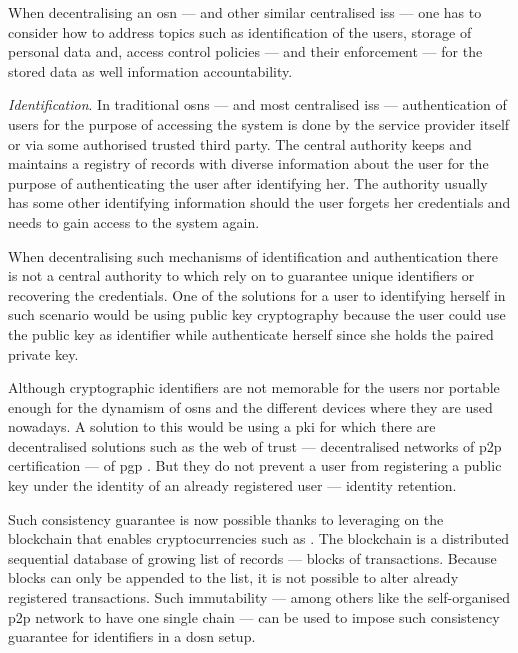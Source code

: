 \documentclass[showtrims,oldfontcommands]{kthesis}
\begin{document}
When decentralising an \ac{osn} --- and other similar centralised \acp{is} --- one 
has to consider how to address topics such as identification of the users, storage 
of personal data and, access control policies --- and their enforcement --- for 
the stored data as well information accountability.

\textit{Identification}. In traditional \acp{osn} --- and most centralised \acp{is} 
--- authentication of users for the purpose of accessing the system is done by the 
service provider itself or via some authorised trusted third party. The central 
authority keeps and maintains a registry of records with diverse information about 
the user for the purpose of authenticating the user after identifying her. The authority 
usually has some other identifying information should the user forgets her credentials 
and needs to gain access to the system again.

When decentralising such mechanisms of identification and authentication there is 
not a central authority to which rely on to guarantee unique identifiers or recovering 
the credentials. One of the solutions for a user to identifying herself in such 
scenario would be using public key cryptography because the user could use the public 
key as identifier while authenticate herself since she holds the paired private key. 

Although cryptographic identifiers are not memorable for the users nor portable 
enough for the dynamism of \acp{osn} and the different devices where they are used 
nowadays. A solution to this would be using a \ac{pki} for which there are decentralised 
solutions such as the web of trust ---  decentralised networks of \ac{p2p} certification 
--- of \ac{pgp} \cite{Stallings95, Abdul97}. But they do not prevent a user from 
registering a public key under the identity of an already registered user --- identity 
retention. 

Such consistency guarantee is now possible thanks to leveraging on the blockchain 
that enables cryptocurrencies such as \Bitcoin \cite{Nakamoto08}. The blockchain 
is a distributed sequential database of growing list of records --- blocks of transactions. 
Because blocks can only be appended to the list, it is not possible to alter already 
registered transactions. Such immutability --- among others like the self-organised 
\ac{p2p} network to have one single chain --- can be used to impose such consistency 
guarantee for identifiers in a \ac{dosn} setup.
\end{document}

